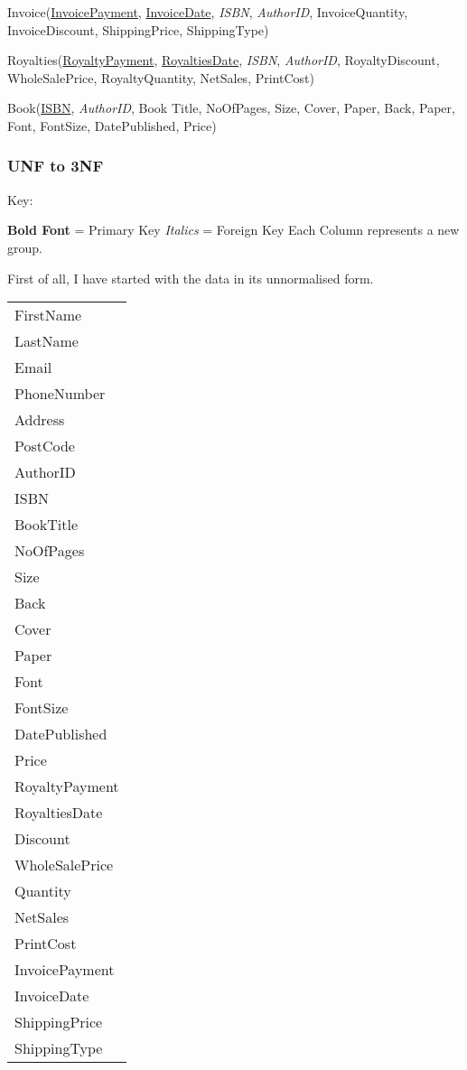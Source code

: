 Invoice(\underline{InvoicePayment}, \underline{InvoiceDate}, \emph{ISBN}, \emph{AuthorID}, InvoiceQuantity, InvoiceDiscount, ShippingPrice, ShippingType)

Royalties(\underline{RoyaltyPayment}, \underline{RoyaltiesDate}, \emph{ISBN}, \emph{AuthorID}, RoyaltyDiscount, WholeSalePrice, RoyaltyQuantity, NetSales, PrintCost)

Book(\underline{ISBN}, \emph{AuthorID}, Book Title, NoOfPages, Size, Cover, Paper, Back, Paper, Font, FontSize, DatePublished, Price)

\subsubsection{UNF to 3NF}

Key:

\textbf{Bold Font} = Primary Key
\emph{Italics} = Foreign Key
Each Column represents a new group.

First of all, I have started with the data in its unnormalised form.

\begin{tabular}{|p{2.5cm}|}
    \hline
    FirstName \\
    LastName \\
    Email \\
    PhoneNumber \\
    Address \\
    PostCode \\
    AuthorID \\
    ISBN \\
    BookTitle \\
    NoOfPages \\
    Size \\
    Back \\
    Cover \\
    Paper \\
    Font \\
    FontSize \\
    DatePublished \\
    Price \\
    RoyaltyPayment \\
    RoyaltiesDate \\
    Discount \\
    WholeSalePrice \\
    Quantity \\
    NetSales \\
    PrintCost \\
    InvoicePayment \\
    InvoiceDate \\
    ShippingPrice \\
    ShippingType \\
    \hline
\end{tabular}

